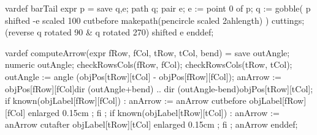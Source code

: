   vardef barTail expr p =
    save q,e; path q; pair e;
    e := point 0 of p;
    q := gobble(
      p shifted -e scaled 100
      cutbefore makepath(pencircle scaled 2ahlength)
    ) cuttings;
    (reverse q rotated 90 & q rotated 270) shifted e
  enddef;

  vardef computeArrow(expr fRow, fCol, tRow, tCol, bend) =
    save outAngle;
    numeric outAngle;
    checkRowsCols(fRow, fCol);
    checkRowsCols(tRow, tCol);
    outAngle := angle (objPos[tRow][tCol] - objPos[fRow][fCol]);
    anArrow := 
      objPos[fRow][fCol]{dir (outAngle+bend)} .. 
      {dir (outAngle-bend)}objPos[tRow][tCol];
    if known(objLabel[fRow][fCol]) :
      anArrow :=
        anArrow cutbefore
        objLabel[fRow][fCol] enlarged 0.15cm ;
    fi ;
    if known(objLabel[tRow][tCol]) :
      anArrow :=
        anArrow cutafter
        objLabel[tRow][tCol] enlarged 0.15cm ;
    fi ;
    anArrow
  enddef;

